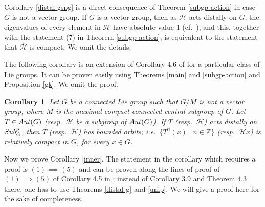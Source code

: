 \documentclass{amsart}
\numberwithin{equation}{section}
\newcommand{\Aut}{{\rm Aut}}
\newcommand{\Z}{{\mathbb Z}}
\newcommand{\Hc}{{\mathcal H}}
\newcommand{\spg}{{\rm Sub}^p_G}
\let\ol=\overline
\newtheorem{cor}[thm]{Corollary}
\theoremstyle{remark}
\begin{document}
Corollary \ref{distal-gspg} is a direct consequence of Theorem \ref{subgp-action} in case $G$ is not a vector group. 
If $G$ is a vector group, then as $\Hc$ acts distally on $G$, the eigenvalues of every element in $\Hc$ 
have absolute value 1 (cf.\ \cite{Ab1}), and this, together with the statement (7) in Theorem \ref{subgp-action},  
is equivalent to the statement that $\ol{\Hc}$ is compact. We omit the details. 

The following corollary is an extension of Corollary 4.6 of \cite{SY3} for a particular class of Lie groups.
 It can be proven easily using Theorems \ref{main} and \ref{subgp-action} and Proposition \ref{gk}. 
 We omit the proof. 

\begin{cor} \label{bounded-orbits}
Let $G$ be a connected Lie group such that $G/M$ is not a vector group, where $M$ is the maximal compact 
connected central subgroup of $G$. Let $T\in\Aut(G)$ {\rm (}resp.\ $\Hc$ be a subgroup of $\Aut(G)${\rm )}. If $T$ 
(resp.\ $\Hc$) acts distally on $\spg$, then $T$ (resp.\ $\Hc$) has bounded orbits; 
i.e.\ $\{T^n(x)\mid n\in\Z\}$ (resp.\ $\Hc x$) is relatively compact in $G$, for every $x\in G$.
\end{cor}

Now we prove Corollary \ref{inner}. The statement in the corollary which requires a proof is $(1)\implies (5)$ 
and can be proven along the lines of proof of $(1)\implies (5)$ of Corollary 4.5 in \cite{SY3}; instead of 
Corollary 3.9 and Theorem 4.3 there, one has to use Theorems \ref{distal-g} and \ref{unip}. 
We will give a proof here for the sake of completeness. 
\end{document}
